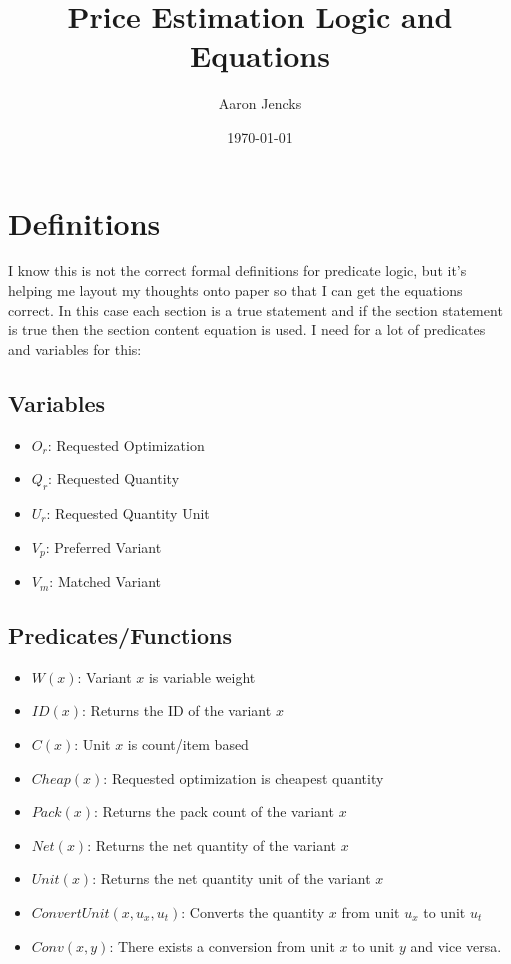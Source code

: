 \documentclass[11pt]{article}
\title{Price Estimation Logic and Equations}
\author{Aaron Jencks}
\date{\today}
\begin{document}
\maketitle

\section{Definitions}

I know this is not the correct formal definitions for predicate logic, but it's helping me layout my thoughts onto paper so that I can get the equations correct. In this case each section is a true statement and if the section statement is true then the section content equation is used. I need for a lot of predicates and variables for this:

\subsection{Variables}

\begin{itemize}
	\item $O_r$: Requested Optimization
	\item $Q_r$: Requested Quantity
	\item $U_r$: Requested Quantity Unit
	\item $V_p$: Preferred Variant
	\item $V_m$: Matched Variant
\end{itemize}

\subsection{Predicates/Functions}

\begin{itemize}
	\item $W(x)$: Variant $x$ is variable weight
	\item $ID(x)$: Returns the ID of the variant $x$
	\item $C(x)$: Unit $x$ is count/item based
	\item $Cheap(x)$: Requested optimization is cheapest quantity
	\item $Pack(x)$: Returns the pack count of the variant $x$
	\item $Net(x)$: Returns the net quantity of the variant $x$
	\item $Unit(x)$: Returns the net quantity unit of the variant $x$
	\item $ConvertUnit(x, u_x, u_t)$: Converts the quantity $x$ from unit $u_x$ to unit $u_t$
	\item $Conv(x, y)$: There exists a conversion from unit $x$ to unit $y$ and vice versa.
\end{itemize}
\end{document}
